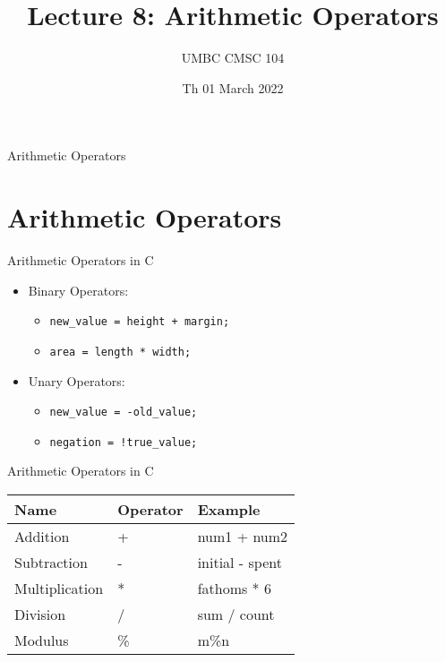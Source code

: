 \documentclass[graphics]{beamer}
\title{Lecture 8: Arithmetic Operators}
\author{UMBC CMSC 104}
\date{Th 01 March 2022}
\begin{document}
\begin{frame}{}
\centering
    Arithmetic Operators
\end{frame}

\frame{\tableofcontents}

\section{Arithmetic Operators}\label{sec:athricop}
\begin{frame}{Arithmetic Operators in C}
    \begin{itemize}
        \item Binary Operators:
        \begin{itemize}
            \item \texttt{new\_value = height + margin;}
            \item \texttt{area = length * width;}
        \end{itemize}
        \item Unary Operators:
        \begin{itemize}
            \item \texttt{new\_value = -old\_value;}
            \item \texttt{negation = !true\_value;}
        \end{itemize}
    \end{itemize}
\end{frame}

\begin{frame}{Arithmetic Operators in C}
    \begin{tabular}{l l l}
        Name & Operator & Example  \\ \hline
        Addition & + & num1 + num2 \\
        Subtraction & - & initial - spent \\
        Multiplication & * & fathoms * 6 \\
        Division & / & sum / count \\
        Modulus & \% & m\%n
    \end{tabular}
\end{frame}
\end{document}
